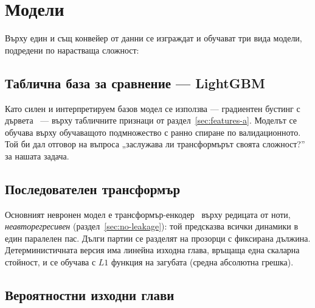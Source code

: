 \section{Модели}
\label{sec:modeli}

Върху един и същ конвейер от данни се изграждат и обучават три вида модели,
подредени по нарастваща сложност:

\subsection{Таблична база за сравнение — LightGBM}
\label{sec:lightgbm}

Като силен и интерпретируем базов модел се използва  — градиентен
бустинг с дървета~\cite{ke2017lightgbm} — върху табличните признаци от
раздел~\ref{sec:features-a}. Моделът се обучава върху обучаващото подмножество с
ранно спиране по валидационното. Той би дал отговор на въпроса „заслужава ли
трансформърът своята сложност?'' за нашата задача.

\subsection{Последователен трансформър}
\label{sec:transformer}

Основният невронен модел е трансформър-енкодер~\cite{vaswani2017attention} върху
редицата от ноти, \emph{неавторегресивен} (раздел~\ref{sec:no-leakage}): той
предсказва всички динамики в един паралелен пас. Дълги партии се разделят на
прозорци с фиксирана дължина. Детерминистичната версия има линейна изходна глава,
връщаща една скаларна стойност, и се обучава с $L1$ функция на загубата (средна абсолютна
грешка).

\subsection{Вероятностни изходни глави}
\label{sec:prob-heads}

